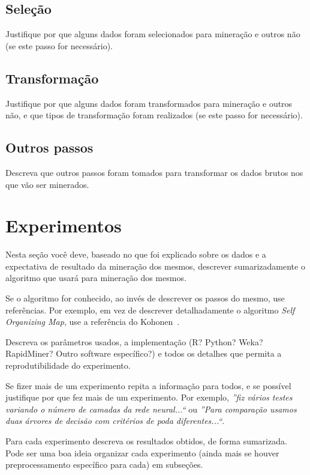\documentclass[12pt]{article}
\begin{document}
\subsection{Seleção}

Justifique por que alguns dados foram selecionados para mineração e outros não (se este passo for necessário). 

\subsection{Transformação}

Justifique por que alguns dados foram transformados para mineração e outros não, e que tipos de transformação foram realizados (se este passo for necessário). 

\subsection{Outros passos}

Descreva que outros passos foram tomados para transformar os dados brutos nos que vão ser minerados.

\section{Experimentos}
\label{sec:experimentos}

Nesta seção você deve, baseado no que foi explicado sobre os dados e a expectativa de resultado da mineração dos mesmos, descrever sumarizadamente o algoritmo que usará para mineração dos mesmos. 

Se o algoritmo for conhecido, ao invés de descrever os passos do mesmo, use referências. Por exemplo, em vez de descrever detalhadamente o algoritmo {\em Self Organizing Map}, use a referência do Kohonen~\cite{Kohonen1997}. 

Descreva os parâmetros usados, a implementação (R? Python? Weka? RapidMiner? Outro software específico?) e todos os detalhes que permita a reprodutibilidade do experimento.

Se fizer mais de um experimento repita a informação para todos, e se possível justifique por que fez mais de um experimento. Por exemplo, \textit{''fiz vários testes variando o número de camadas da rede neural...``} ou \textit{''Para comparação usamos duas árvores de decisão com critérios de poda diferentes...``}. 

Para cada experimento descreva os resultados obtidos, de forma sumarizada. Pode ser uma boa ideia organizar cada experimento (ainda mais se houver preprocessamento específico para cada) em subseções.
\end{document}
